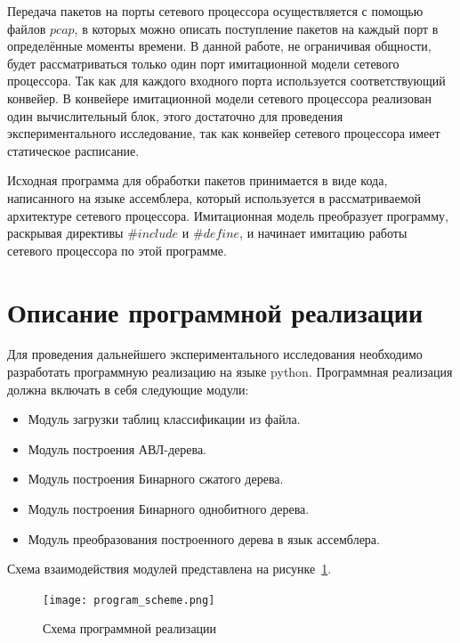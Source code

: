 \documentclass[a4paper, 12pt, titlepage, finall]{extreport}
\begin{document}
        Передача пакетов на порты сетевого процессора осуществляется с помощью файлов $pcap$, в которых можно описать поступление пакетов на каждый порт в определённые моменты времени.
        В данной работе, не ограничивая общности, будет рассматриваться только один порт имитационной модели сетевого процессора. Так как для каждого входного
        порта используется соответствующий конвейер. В конвейере имитационной модели сетевого процессора реализован один вычислительный блок, этого достаточно для проведения 
        экспериментального исследование, так как конвейер сетевого процессора имеет статическое расписание.

        Исходная программа для обработки пакетов принимается в виде кода, написанного на языке ассемблера, который используется в рассматриваемой архитектуре сетевого процессора.
        Имитационная модель преобразует программу, раскрывая директивы $\#include$ и $\#define$, и начинает имитацию работы сетевого процессора по этой программе.
        
        
    \section{Описание программной реализации}
        Для проведения дальнейшего экспериментального исследования необходимо разработать программную реализацию на языке python. Программная реализация должна включать в себя
        следующие модули:
        
        \begin{itemize}
            \item Модуль загрузки таблиц классификации из файла.
            \item Модуль построения АВЛ-дерева.
            \item Модуль построения Бинарного сжатого дерева.
            \item Модуль построения Бинарного однобитного дерева.
            \item Модуль преобразования построенного дерева в язык ассемблера.
        \end{itemize}
        Схема взаимодействия модулей представлена на рисунке~\ref{fig:mesh5}.
       
        \begin{figure}[ht]
            \centering
            \texttt{[image: program\_scheme.png]}
            \caption{Схема программной реализации}\label{fig:mesh5}
        \end{figure}        
\end{document}

